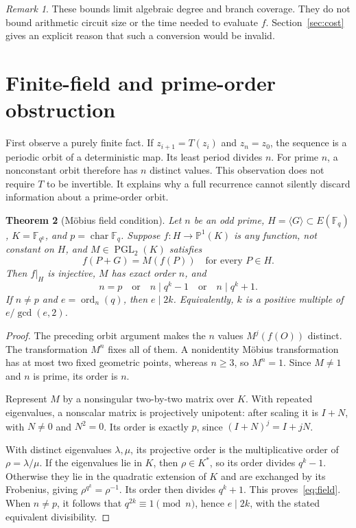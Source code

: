 \documentclass[11pt,letterpaper]{article}
\newtheorem{theorem}{Theorem}[section]
\theoremstyle{definition}
\theoremstyle{remark}
\newtheorem{remark}[theorem]{Remark}
\newcommand{\F}{\mathbb F}
\newcommand{\PP}{\mathbb P}
\newcommand{\ord}{\operatorname{ord}}
\newcommand{\PGL}{\operatorname{PGL}}
\begin{document}
\begin{remark}
These bounds limit algebraic degree and branch coverage. They do not bound arithmetic circuit size or the time needed to evaluate $f$. Section~\ref{sec:cost} gives an explicit reason that such a conversion would be invalid.
\end{remark}

\section{Finite-field and prime-order obstruction}

First observe a purely finite fact. If $z_{i+1}=T(z_i)$ and $z_n=z_0$, the sequence is a periodic orbit of a deterministic map. Its least period divides $n$. For prime $n$, a nonconstant orbit therefore has $n$ distinct values. This observation does not require $T$ to be invertible. It explains why a full recurrence cannot silently discard information about a prime-order orbit.

\begin{theorem}[M\"obius field condition]\label{thm:field}
Let $n$ be an odd prime, $H=\langle G\rangle\subset E(\F_q)$, $K=\F_{q^k}$, and $p=\operatorname{char}\F_q$. Suppose $f:H\to\PP^1(K)$ is any function, not constant on $H$, and $M\in\PGL_2(K)$ satisfies
\[
f(P+G)=M(f(P))\quad\text{for every }P\in H.
\]
Then $f|_H$ is injective, $M$ has exact order $n$, and
\begin{equation}\label{eq:field}
n=p\quad\text{or}\quad n\mid q^k-1\quad\text{or}\quad n\mid q^k+1.
\end{equation}
If $n\ne p$ and $e=\ord_n(q)$, then $e\mid2k$. Equivalently, $k$ is a positive multiple of $e/\gcd(e,2)$.
\end{theorem}
\begin{proof}
The preceding orbit argument makes the $n$ values $M^j(f(O))$ distinct. The transformation $M^n$ fixes all of them. A nonidentity M\"obius transformation has at most two fixed geometric points, whereas $n\ge3$, so $M^n=1$. Since $M\ne1$ and $n$ is prime, its order is $n$.

Represent $M$ by a nonsingular two-by-two matrix over $K$. With repeated eigenvalues, a nonscalar matrix is projectively unipotent: after scaling it is $I+N$, with $N\ne0$ and $N^2=0$. Its order is exactly $p$, since $(I+N)^j=I+jN$.

With distinct eigenvalues $\lambda,\mu$, its projective order is the multiplicative order of $\rho=\lambda/\mu$. If the eigenvalues lie in $K$, then $\rho\in K^*$, so its order divides $q^k-1$. Otherwise they lie in the quadratic extension of $K$ and are exchanged by its Frobenius, giving $\rho^{q^k}=\rho^{-1}$. Its order then divides $q^k+1$. This proves~\eqref{eq:field}. When $n\ne p$, it follows that $q^{2k}\equiv1\pmod n$, hence $e\mid2k$, with the stated equivalent divisibility.
\end{proof}
\end{document}
